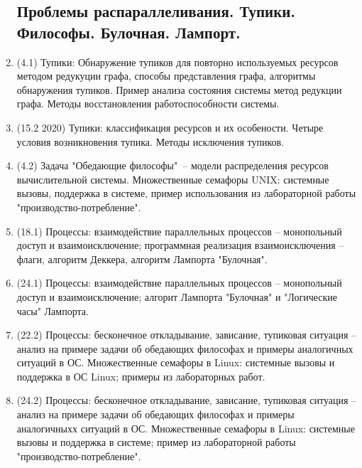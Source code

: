 \documentclass[a4paper,14pt]{extreport}
\begin{document}
\begin{enumerate}
\subsection{Проблемы распараллеливания. Тупики. Философы. Булочная. Лампорт.}
    \item (4.1) Тупики: Обнаружение тупиков для повторно используемых ресурсов
        методом редукуции графа, способы представления графа, алгоритмы
        обнаружения тупиков. Пример анализа состояния системы метод редукции
        графа. Методы восстановления работоспособности системы.
    \item (15.2 2020) Тупики: классификация ресурсов и их особености. Четыре
        условия возникновения тупика. Методы исключения тупиков.
    \item (4.2) Задача "Обедающие философы"\ -- модели распределения
        ресурсов вычислительной системы. Множественные семафоры UNIX:
        системные вызовы, поддержка в системе, пример использования из
        лабораторной работы "производство-потребление".
    \item (18.1) Процессы: взаимодействие параллельных процессов --
        монопольный доступ и взаимоисключение; программная
        реализация взаимоисключения -- флаги, алгоритм Деккера, алгоритм
        Лампорта "Булочная".
    \item (24.1) Процессы: взаимодействие параллельных процессов --
        монопольный доступ и взаимоисключение; алгорит Лампорта
        "Булочная" и "Логические часы" Лампорта.
    \item (22.2) Процессы: бесконечное откладывание, зависание, тупиковая
        ситуация -- анализ на примере задачи об обедающих философах и примеры
        аналогичных ситуаций в ОС. Множественные семафоры в Linux:
        системные вызовы и поддержка в ОС Linux; примеры из лабораторных
        работ.
    \item (24.2) Процессы: бесконечное откладывание, зависание, тупиковая
        ситуация -- анализ на примере задачи об обедающих философах и примеры
        аналогичныхх ситуаций в ОС. Множественные семафоры в Linux: системные
        вызовы и поддержка в системе; пример из лабораторной работы
        "производство-потребление".


\end{enumerate}
\end{document}
